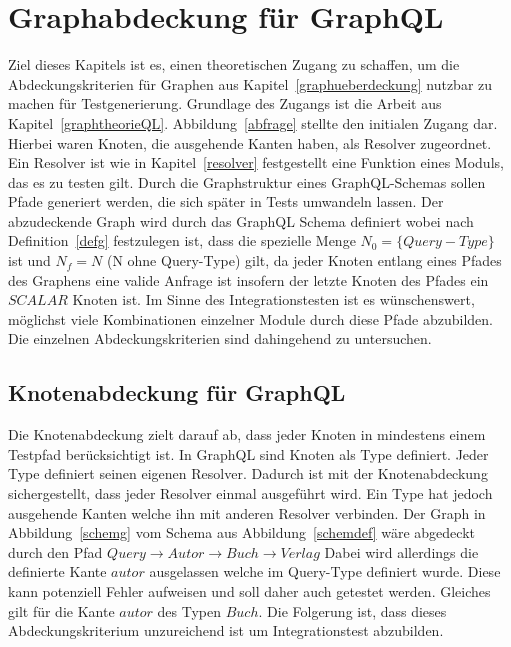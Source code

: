 \chapter{Graphabdeckung für GraphQL}
\label{gqlcov}

Ziel dieses Kapitels ist es, einen theoretischen Zugang zu schaffen, um die Abdeckungskriterien für Graphen aus Kapitel~\ref{graphueberdeckung} nutzbar zu machen für Testgenerierung.
Grundlage des Zugangs ist die Arbeit aus Kapitel~\ref{graphtheorieQL}.
Abbildung~\ref{abfrage} stellte den initialen Zugang dar.
Hierbei waren Knoten, die ausgehende Kanten haben, als Resolver zugeordnet.
Ein Resolver ist wie in Kapitel~\ref{resolver} festgestellt eine Funktion eines Moduls, das es zu testen gilt.
Durch die Graphstruktur eines GraphQL-Schemas sollen Pfade generiert werden, die sich später in Tests umwandeln lassen.
Der abzudeckende Graph wird durch das GraphQL Schema definiert wobei nach Definition~\ref{defg} festzulegen ist,
dass die spezielle Menge $N_{0} = \{ Query-Type \}$ ist und $N_{f} = N$ (N ohne Query-Type) gilt, da jeder Knoten entlang eines Pfades des Graphens eine valide Anfrage ist insofern der letzte
Knoten des Pfades ein $SCALAR$ Knoten ist.
Im Sinne des Integrationstesten ist es wünschenswert, möglichst viele Kombinationen einzelner Module durch diese Pfade abzubilden.
Die einzelnen Abdeckungskriterien sind dahingehend zu untersuchen.

\section{Knotenabdeckung für GraphQL}

Die Knotenabdeckung zielt darauf ab, dass jeder Knoten in mindestens einem Testpfad berücksichtigt ist.
In GraphQL sind Knoten als Type definiert.
Jeder Type definiert seinen eigenen Resolver.
Dadurch ist mit der Knotenabdeckung sichergestellt, dass jeder Resolver einmal ausgeführt wird.
Ein Type hat jedoch ausgehende Kanten welche ihn mit anderen Resolver verbinden.
Der Graph in Abbildung~\ref{schemg} vom Schema aus Abbildung~\ref{schemdef} wäre abgedeckt durch den Pfad
$ Query \rightarrow Autor \rightarrow Buch \rightarrow Verlag $
Dabei wird allerdings die definierte Kante $autor$ ausgelassen welche im Query-Type definiert wurde.
Diese kann potenziell Fehler aufweisen und soll daher auch getestet werden.
Gleiches gilt für die Kante $autor$ des Typen $Buch$.
Die Folgerung ist, dass dieses Abdeckungskriterium unzureichend ist um Integrationstest abzubilden.

